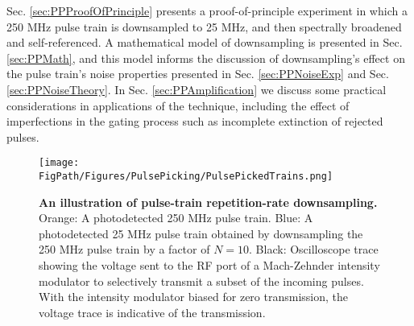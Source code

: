 Sec. \ref{sec:PPProofOfPrinciple} presents a proof-of-principle experiment in which a 250 MHz pulse train is downsampled to 25 MHz, and then spectrally broadened and self-referenced. A mathematical model of downsampling is presented in Sec. \ref{sec:PPMath}, and this model informs the discussion of downsampling's effect on the pulse train's noise properties presented in Sec. \ref{sec:PPNoiseExp} and Sec. \ref{sec:PPNoiseTheory}. In Sec. \ref{sec:PPAmplification} we discuss some practical considerations in applications of the technique, including the effect of imperfections in the gating process such as incomplete extinction of rejected pulses.



\begin{figure}[htpb]
	\begin{center}
		\texttt{[image: \\FigPath/Figures/PulsePicking/PulsePickedTrains.png]}
	\end{center}
	\caption[An illustration of pulse-train repetition-rate downsampling]{\textbf{An illustration of pulse-train repetition-rate downsampling.} Orange: A photodetected 250 MHz pulse train. Blue: A photodetected 25 MHz pulse train obtained by downsampling the 250 MHz pulse train by a factor of $N=10$. Black: Oscilloscope trace showing the voltage sent to the RF port of a Mach-Zehnder intensity modulator to selectively transmit a subset of the incoming pulses. With the intensity modulator biased for zero transmission, the voltage trace is indicative of the transmission.}
	\label{fig:PPConcept}
\end{figure} 





